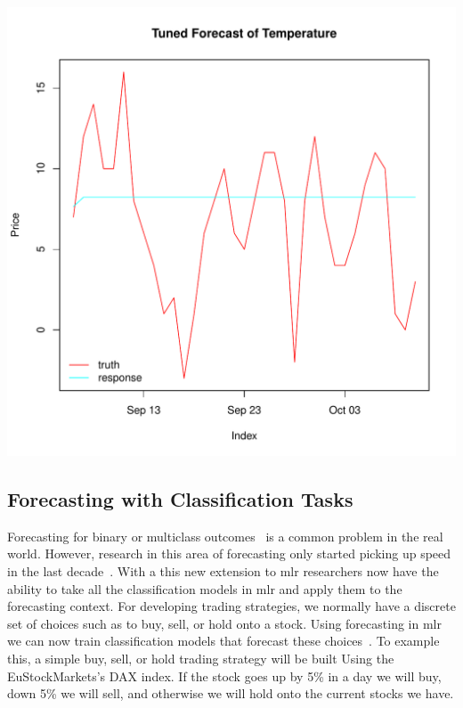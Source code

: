 \documentclass[12pt]{article}\usepackage[]{graphicx}\usepackage[]{color}
\makeatletter
\def\maxwidth{ %
  \ifdim\Gin@nat@width>\linewidth
    \linewidth
  \else
    \Gin@nat@width
  \fi
}
\newenvironment{knitrout}{}{} %
\theoremstyle{definition}
\newcommand\code{\@codex}
\def\@codex#1{{\normalfont\ttfamily\hyphenchar\font=-1 #1}}
\newcommand{\pkg}[1]{{\fontseries{b}\selectfont #1}}
\makeatother
\begin{document}
\begin{knitrout}
\color{fgcolor}
\includegraphics[width=\maxwidth]{figure/forecastgbmplot-1} 

\end{knitrout}

\subsection{Forecasting with Classification Tasks}

Forecasting for binary or multiclass outcomes~\cite{forecastBinary} is a common problem in the real world. However, research in this area of forecasting only started picking up speed in the last decade~\cite{ElliotBinary}. With a this new extension to \pkg{mlr} researchers now have the ability to take all the classification models in \pkg{mlr} and apply them to the forecasting context. For developing trading strategies, we normally have a discrete set of choices such as to buy, sell, or hold onto a stock. Using forecasting in mlr we can now train classification models that forecast these choices~\cite{foreclassif}. To example this, a simple buy, sell, or hold trading strategy will be built Using the \code{EuStockMarkets}'s DAX index. If the stock goes up by 5\% in a day we will buy, down 5\% we will sell, and otherwise we will hold onto the current stocks we have. 
\end{document}
